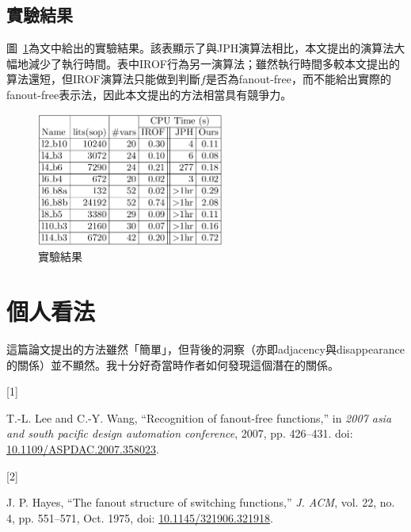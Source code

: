 \documentclass[
  12pt,
  paper=a4,
  ,captions=tableheading
]{scrartcl}
\newlength{\cslhangindent}
\newlength{\csllabelwidth}
\newenvironment{CSLReferences}[2] %
 {%
  \setlength{\parindent}{0pt}
  \ifodd #1 \everypar{\setlength{\hangindent}{\cslhangindent}}\ignorespaces\fi
  \ifnum #2 > 0
  \setlength{\parskip}{#2\baselineskip}
  \fi
 }%
 {}
\newcommand{\CSLLeftMargin}[1]{\parbox[t]{\csllabelwidth}{#1}}
\newcommand{\CSLRightInline}[1]{\parbox[t]{\linewidth - \csllabelwidth}{#1}\break}
\begin{document}
\hypertarget{ux5be6ux9a57ux7d50ux679c}{%
\subsection{實驗結果}\label{ux5be6ux9a57ux7d50ux679c}}

圖~\ref{fig:exp}為文中給出的實驗結果。該表顯示了與JPH演算法相比，本文提出的演算法大幅地減少了執行時間。表中IROF行為另一演算法；雖然執行時間多較本文提出的算法還短，但IROF演算法只能做到判斷\(f\)是否為fanout-free，而不能給出實際的fanout-free表示法，因此本文提出的方法相當具有競爭力。

\begin{figure}
\hypertarget{fig:exp}{%
\centering
\includegraphics[width=0.55\textwidth,height=\textheight]{./resources/res.png}
\caption{實驗結果}\label{fig:exp}
}
\end{figure}

\hypertarget{ux500bux4ebaux770bux6cd5}{%
\section{個人看法}\label{ux500bux4ebaux770bux6cd5}}

這篇論文提出的方法雖然「簡單」，但背後的洞察（亦即adjacency與disappearance的關係）並不顯然。我十分好奇當時作者如何發現這個潛在的關係。

\hypertarget{refs}{}
\begin{CSLReferences}{0}{0}
\leavevmode{}%
\CSLLeftMargin{{[}1{]} }
\CSLRightInline{T.-L. Lee and C.-Y. Wang, {``Recognition of fanout-free
functions,''} in \emph{2007 asia and south pacific design automation
conference}, 2007, pp. 426--431. doi:
\href{https://doi.org/10.1109/ASPDAC.2007.358023}{10.1109/ASPDAC.2007.358023}.}

\leavevmode{}%
\CSLLeftMargin{{[}2{]} }
\CSLRightInline{J. P. Hayes, {``The fanout structure of switching
functions,''} \emph{J. ACM}, vol. 22, no. 4, pp. 551--571, Oct. 1975,
doi:
\href{https://doi.org/10.1145/321906.321918}{10.1145/321906.321918}.}

\end{CSLReferences}
\end{document}
